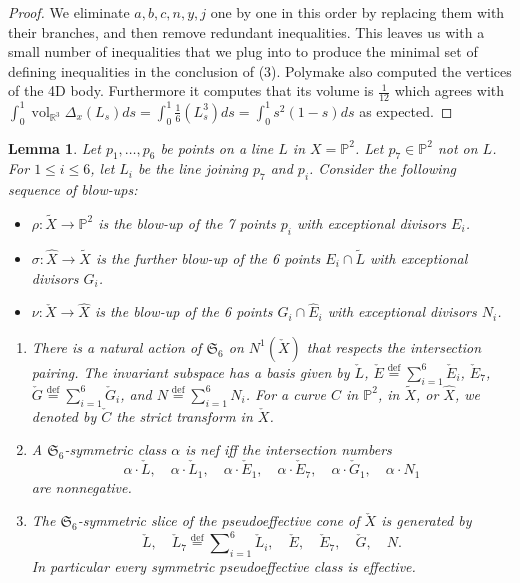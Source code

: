 \documentclass[12pt]{amsart}
\newtheorem{lemma}{Lemma}[section]
\theoremstyle{definition}
\newcommand{\bb}{\ensuremath{\mathfrak{b}}}
\renewcommand{\leq}{\leqslant}
\DeclareMathOperator{\vol}{vol}
\newcommand{\deq}{\ensuremath{\stackrel{\textrm{def}}{=}}}
\newcommand{\inob}[2]{\ensuremath{{\Delta}_{#1}(#2)}}
\newcommand{\?}{ \circled{{\large\bf ?}}}
\let\frak\mathfrak
\let\bb\mathbb
\begin{document}
\begin{proof}
We eliminate $a,b,c,n,y,j$ one by one in this order by replacing them with their branches, and then remove redundant inequalities. This leaves us with a small number of inequalities that we plug into \cite{Polymake} to produce the minimal set of defining inequalities in the conclusion of (3). Polymake also computed the vertices of the 4D body. Furthermore it computes that its volume is $\frac 1{12}$ which agrees with $\int_0^1\vol_{\bb R^3}\inob{x}{L_s}ds=\int_0^1\frac 16(L_s^3)ds=\int_0^1s^2(1-s)ds$ as expected.
\end{proof}

\begin{lemma}\label{lem:P2blow7}
	Let $p_1,\ldots, p_6$ be points on a line $L$ in $X=\bb P^2$. Let $p_7\in\bb P^2$ not on $L$. For $1\leq i\leq 6$, let $L_i$ be the line joining $p_7$ and $p_i$. Consider the following sequence of blow-ups:
	\begin{itemize}
		\item $\rho:\widetilde{X}\to\bb P^2$ is the blow-up of the 7 points $p_i$ with exceptional divisors $E_i$.
		\smallskip
		
		\item $\sigma:\widehat X\to\widetilde X$ is the further blow-up of the 6 points $E_i\cap\widetilde L$ with exceptional divisors $G_i$.
\smallskip

		\item $\nu:\check X\to\widehat X$ is the blow-up of the 6 points $G_i\cap\widehat E_i$ with exceptional divisors $N_i$. 
	\end{itemize} 
\begin{enumerate}
	\item There is a natural action of $\frak S_6$ on $N^1(\check X)$ that respects the intersection pairing. The invariant subspace has a basis given by $\check L$, $\check E\deq\sum_{i=1}^6\check E_i$, $\check E_7$, $\check G\deq\sum_{i=1}^6\check G_i$, and $N\deq\sum_{i=1}^6N_i$. For a curve $C$ in $\bb P^2$, in $\widetilde X$, or $\widehat X$, we denoted by $\check C$ the strict transform in $\check X$.
\smallskip

	\item A $\frak S_6$-symmetric class $\alpha$ is nef iff the intersection numbers 
	\[\alpha\cdot\check L,\quad \alpha\cdot\check L_1,\quad \alpha\cdot\check E_1,\quad \alpha\cdot\check E_7,\quad \alpha\cdot\check G_1,\quad\alpha\cdot N_1\] are nonnegative.
\smallskip

	\item The $\frak S_6$-symmetric slice of the pseudoeffective cone of $\check X$ is generated by 
	\[\check L,\quad\check L_7\deq\sum\nolimits_{i=1}^6\check L_i,\quad \check E,\quad\check E_7,\quad\check G,\quad N.\]
	In particular every symmetric pseudoeffective class is effective. 
\smallskip


\end{enumerate}
\end{lemma}
\end{document}
